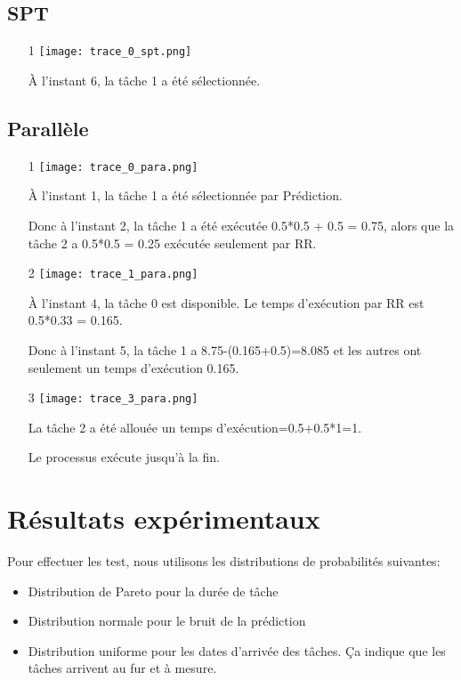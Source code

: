 \documentclass[12pt]{article}
\begin{document}
    \subsection{SPT}
    
    \begin{itemize}
        \item[1]\texttt{[image: trace\_0\_spt.png]}
        
        À l'instant 6, la tâche 1 a été sélectionnée.
        
    \end{itemize}
    
    \subsection{Parallèle}
    
    \begin{itemize}
        \item[1]\texttt{[image: trace\_0\_para.png]}
        
        À l'instant 1, la tâche 1 a été sélectionnée par Prédiction.
        
        Donc à l'instant 2, la tâche 1 a été exécutée 0.5*0.5 + 0.5 = 0.75, alors que la tâche 2 a 0.5*0.5 = 0.25 exécutée seulement par RR.
        
        \item[2]\texttt{[image: trace\_1\_para.png]}
        
        À l'instant 4, la tâche 0 est disponible. Le temps d'exécution par RR est 0.5*0.33 = 0.165.
        
        Donc à l'instant 5, la tâche 1 a 8.75-(0.165+0.5)=8.085 et les autres ont seulement un temps d'exécution 0.165.
        
        \item[3]\texttt{[image: trace\_3\_para.png]}
        
        La tâche 2 a été allouée un temps d'exécution=0.5+0.5*1=1.
        
        Le processus exécute jusqu'à la fin.
        
        
    \end{itemize}    
    
\newpage
\section{Résultats expérimentaux}

    Pour effectuer les test, nous utilisons les distributions de probabilités suivantes:
    \begin{itemize}
        \item Distribution de Pareto pour la durée de tâche
        \item Distribution normale pour le bruit de la prédiction
        \item Distribution uniforme pour les dates d'arrivée des tâches. Ça indique que les tâches arrivent au fur et à mesure.
    \end{itemize}
\end{document}
